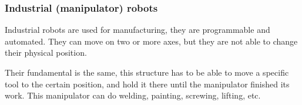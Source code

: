 			\subsubsection{Industrial (manipulator) robots}
			
				\hspace{15pt}Industrial robots are used for manufacturing, they are programmable and automated. They can move on two or more axes, but they are not able to change their physical position.
				
				Their fundamental is the same, this structure has to be able to move a specific tool to the certain position, and hold it there until the manipulator finished its work. This manipulator can do welding, painting, screwing, lifting, etc. \cite{robotics2}


